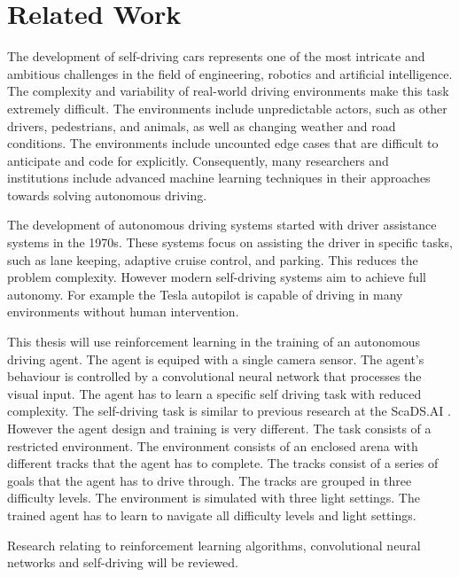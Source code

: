 \chapter{Related Work}
\label{cha:Related Work}


The development of self-driving cars represents one of the most intricate and ambitious challenges in the field of engineering, robotics and artificial intelligence. The complexity and variability of real-world driving environments make this task extremely difficult. The environments include unpredictable actors, such as other drivers, pedestrians, and animals, as well as changing weather and road conditions. The environments include uncounted edge cases that are difficult to anticipate and code for explicitly. Consequently, many researchers and institutions include advanced machine learning techniques in their approaches towards solving autonomous driving.

The development of autonomous driving systems started with driver assistance systems in the 1970s. These systems focus on assisting the driver in specific tasks, such as lane keeping, adaptive cruise control, and parking. This reduces the problem complexity. However modern self-driving systems aim to achieve full autonomy. For example the Tesla autopilot is capable of driving in many environments without human intervention.

This thesis will use reinforcement learning in the training of an autonomous driving agent. The agent is equiped with a single camera sensor. The agent's behaviour is controlled by a convolutional neural network that processes the visual input. The agent has to learn a specific self driving task with reduced complexity. The self-driving task is similar to previous research at the ScaDS.AI \autocite{maximilian}. However the agent design and training is very different.
The task consists of a restricted environment. The environment consists of an enclosed arena with different tracks that the agent has to complete. The tracks consist of a series of goals that the agent has to drive through. The tracks are grouped in three difficulty levels.
The environment is simulated with three light settings. The trained agent has to learn to navigate all difficulty levels and light settings.

Research relating to reinforcement learning algorithms, convolutional neural networks and self-driving will be reviewed.



